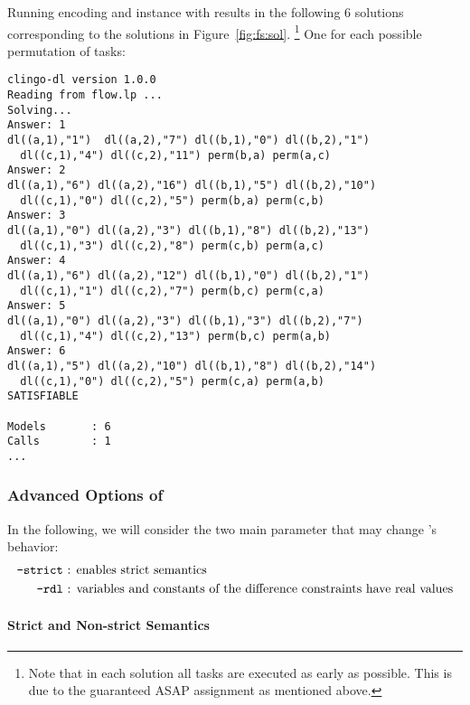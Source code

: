 \begin{example}
Running encoding and instance with  results in the following $6$ solutions
corresponding to the solutions in Figure~\ref{fig:fs:sol}.%
\footnote{Note that in each solution all tasks are executed as early as possible.
  This is due to the guaranteed ASAP assignment as mentioned above.}
One for each possible permutation of tasks:
 \begin{lstlisting}[numbers=none]
clingo-dl version 1.0.0
Reading from flow.lp ...
Solving...
Answer: 1
dl((a,1),"1")  dl((a,2),"7") dl((b,1),"0") dl((b,2),"1") 
  dl((c,1),"4") dl((c,2),"11") perm(b,a) perm(a,c)
Answer: 2
dl((a,1),"6") dl((a,2),"16") dl((b,1),"5") dl((b,2),"10") 
  dl((c,1),"0") dl((c,2),"5") perm(b,a) perm(c,b)
Answer: 3
dl((a,1),"0") dl((a,2),"3") dl((b,1),"8") dl((b,2),"13") 
  dl((c,1),"3") dl((c,2),"8") perm(c,b) perm(a,c)
Answer: 4
dl((a,1),"6") dl((a,2),"12") dl((b,1),"0") dl((b,2),"1") 
  dl((c,1),"1") dl((c,2),"7") perm(b,c) perm(c,a)
Answer: 5
dl((a,1),"0") dl((a,2),"3") dl((b,1),"3") dl((b,2),"7") 
  dl((c,1),"4") dl((c,2),"13") perm(b,c) perm(a,b)
Answer: 6
dl((a,1),"5") dl((a,2),"10") dl((b,1),"8") dl((b,2),"14") 
  dl((c,1),"0") dl((c,2),"5") perm(c,a) perm(a,b)
SATISFIABLE

Models       : 6
Calls        : 1
...
\end{lstlisting}
\end{example}

\subsubsection{Advanced Options of }

In the following, we will consider the two main parameter that may change 's behavior:
\begin{align*}
 \texttt{--strict}& \text{ : enables strict semantics}\\
 \texttt{--rdl}& \text{ : variables and constants of the difference constraints have real values} 
\end{align*}

\paragraph{Strict and Non-strict Semantics}

